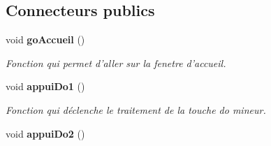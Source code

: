 \subsection*{Connecteurs publics}
\begin{DoxyCompactItemize}
\item 
void {\bf go\-Accueil} ()
\begin{DoxyCompactList}\small\item\em Fonction qui permet d'aller sur la fenetre d'accueil. \end{DoxyCompactList}\item 
void {\bf appui\-Do1} ()
\begin{DoxyCompactList}\small\item\em Fonction qui déclenche le traitement de la touche do mineur. \end{DoxyCompactList}\item 
void {\bfseries appui\-Do2} ()\label{class_entrainement_facile_afc632a43affef76c28967b624c59a781}


\end{DoxyCompactItemize}
